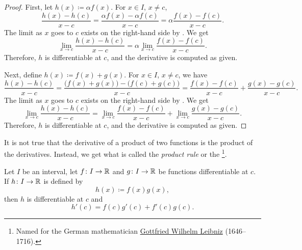 \begin{proof}
First, let $h(x) \coloneqq \alpha f(x)$.
For $x \in I$, $x \neq c$,
\begin{equation*}
\frac{h(x)-h(c)}{x-c} =
\frac{\alpha f(x) - \alpha f(c)}{x-c}
=
\alpha \frac{f(x) - f(c)}{x-c} .
\end{equation*}
The limit as $x$ goes to $c$ exists on the right-hand side
by .  We get
\begin{equation*}
\lim_{x\to c}\frac{h(x)-h(c)}{x-c} =
\alpha \lim_{x\to c} \frac{f(x) - f(c)}{x-c} .
\end{equation*}
Therefore, $h$ is differentiable at $c$,
and the derivative is computed as given.

Next, define $h(x) \coloneqq f(x)+g(x)$.
For $x \in I$, $x \neq c$, we have
\begin{equation*}
\frac{h(x)-h(c)}{x-c} =
\frac{\bigl(f(x) + g(x)\bigr) - \bigl(f(c) + g(c)\bigr)}{x-c}
=
\frac{f(x) - f(c)}{x-c}
+
\frac{g(x) - g(c)}{x-c} .
\end{equation*}
The limit as $x$ goes to $c$ exists on the right-hand side
by .  We get
\begin{equation*}
\lim_{x\to c}\frac{h(x)-h(c)}{x-c} =
\lim_{x\to c} \frac{f(x) - f(c)}{x-c}
+
\lim_{x\to c}\frac{g(x) - g(c)}{x-c} .
\end{equation*}
Therefore, $h$ is differentiable at $c$,
and the derivative is computed as given.
\end{proof}

It is not true that the derivative of a product of two functions is
the product of the derivatives.
Instead, we get what is called the \emph{product rule}
or the \emph{}%
\footnote{Named for the German mathematician
\href{https://en.wikipedia.org/wiki/Leibniz}{Gottfried Wilhelm Leibniz}
(1646--1716).}.

\begin{prop}
Let $I$ be an interval, let
$f \colon I \to {\mathbb{R}}$ and $g \colon I \to {\mathbb{R}}$ be 
functions differentiable at $c$.  If $h \colon I \to {\mathbb{R}}$
is defined by
\begin{equation*}
h(x) \coloneqq f(x) g(x) ,
\end{equation*}
then $h$ is differentiable at $c$ and
\begin{equation*}
h'(c) = f(c) g'(c) + f'(c) g(c) .
\end{equation*}
\end{prop}

